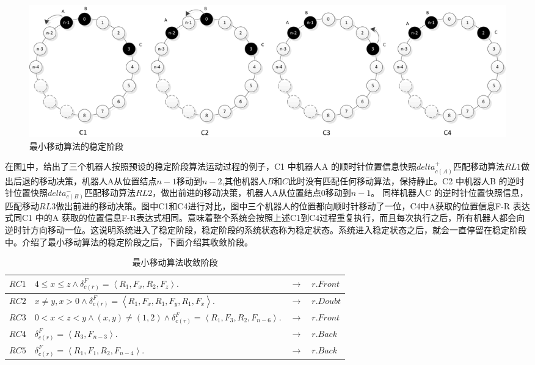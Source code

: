 \begin{figure}[!hbt]
	\centering
	\includegraphics[width=6.5 in]{fig/perpetualexploration.png}
	\caption{最小移动算法的稳定阶段}
	\label{fig:perpetualexploration}
\end{figure}

\vspace{0.5cm}

在图\ref{fig:perpetualexploration}中，给出了三个机器人按照预设的稳定阶段算法运动过程的例子，C1 中机器人A 的顺时针位置信息快照${delta_{c\left( A\right)}^+}$匹配移动算法$RL1$做出后退的移动决策，机器人A从位置结点$n-1$移动到$n-2$,其他机器人$B$和$C$此时没有匹配任何移动算法，保持静止。C2 中机器人B 的逆时针位置快照${delta_{c\left( B\right)}^-}$匹配移动算法$RL2$，做出前进的移动决策，机器人A从位置结点$0$移动到$n-1$。 同样机器人C 的逆时针位置快照信息，匹配移动$RL3$做出前进的移动决策。图中C1和C4进行对比，图中三个机器人的位置都向顺时针移动了一位，C4中A获取的位置信息F-R 表达式同C1 中的A 获取的位置信息F-R表达式相同。意味着整个系统会按照上述C1到C4过程重复执行，而且每次执行之后，所有机器人都会向逆时针方向移动一位。这说明系统进入了稳定阶段，稳定阶段的系统状态称为稳定状态。系统进入稳定状态之后，就会一直停留在稳定阶段中。介绍了最小移动算法的稳定阶段之后，下面介绍其收敛阶段。

\begin{table}[hbt]
    \centering
    \caption{最小移动算法收敛阶段}
    \begin{tabular}{|p{2cm}|p{8cm}|p{1cm}|p{2cm}|}
        \hline
        $RC1$&$4 \leq x \leq z  \land \delta_{c\left(r\right)}^F = \left\langle R_1,F_x,R_2,F_z\right\rangle.$&$\rightarrow$&$r.Front$\\
        \hline
        $RC2$&$x \neq y,x>0 \land \delta_{c\left(r\right)}^F = \left\langle R_1,F_x,R_1,F_y,R_1,F_x\right\rangle.$&$\rightarrow$&$r.Doubt$\\
        \hline
        $RC3$&$0<x<z<y \land \left( x,y \right) \neq  \left( 1,2 \right)\land \delta_{c \left(r\right)}^F = \left\langle R_1,F_3,R_2,F_{n-6}\right\rangle.$&$\rightarrow$&$r.Front$\\
        \hline
        $RC4$&$\delta_{c\left(r\right)}^F = \left\langle R_3,F_{n-3}\right\rangle.$&$\rightarrow$&$r.Back$\\
        \hline
        $RC5$&$\delta_{c\left(r\right)}^F = \left\langle R_1,F_1,R_2,F_{n-4}\right\rangle.$&$\rightarrow$&$r.Back$\\
        \hline
    \end{tabular}
    \label{table:minalgotithmconvergence}
\end{table}

